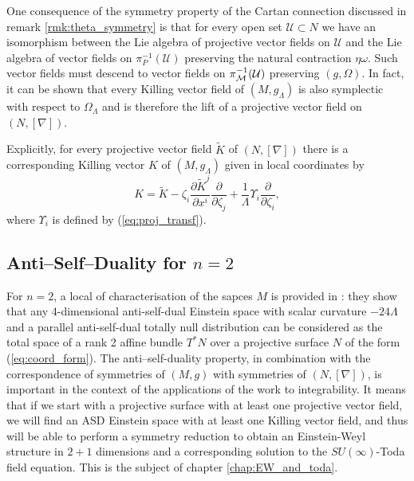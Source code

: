 One consequence of the symmetry property of the Cartan connection discussed in remark \ref{rmk:theta_symmetry} is that for every open set $\mathcal{U}\subset N$ we have an isomorphism between the Lie algebra of projective vector fields on $\mathcal{U}$ and the Lie algebra of vector fields on $\pi_P^{-1}(\mathcal{U})$ preserving the natural contraction $\eta\omega$. Such vector fields must descend to vector fields on $\pi_{\mathcal{M}}^{-1}(\mathcal{U})$ preserving $(g,\Omega)$. In fact, it can be shown that every Killing vector field of $(M,g_\Lambda)$ is also symplectic with respect to $\Omega_\Lambda$ and is therefore the lift of a projective vector field on $(N,[\nabla])$.

Explicitly, for every projective vector field $\tilde{K}$ of $(N,[\nabla])$
there is a corresponding Killing vector $K$ of $(M,g_{\Lambda})$
given in local coordinates by 
\begin{equation}
{K}=\tilde{K}-\zeta_{i}\frac{\partial \tilde{K}^{j}}{\partial x^{i}}\frac{\partial}{\partial \zeta_{j}}+\frac{1}{\Lambda}\Upsilon_{i}\frac{\partial}{\partial \zeta_{i}},\label{eq:kvf_from_pvf}
\end{equation}
where $\Upsilon_{i}$ is defined by (\ref{eq:proj_transf}).

\subsection{Anti--Self--Duality for $n=2$}

For $n=2$, a local of characterisation of the sapces $M$ is provided in
\cite{DM}: they show that any 4-dimensional anti-self-dual
Einstein space with scalar curvature $-24\Lambda$ and a parallel
anti-self-dual totally null distribution can be considered as the
total space of a rank 2 affine bundle $T^{*}N$ over a projective
surface $N$ of the form (\ref{eq:coord_form}). The anti--self-duality property, in combination with the correspondence of symmetries of $(M,g)$ with symmetries of $(N,[\nabla])$, is important in the context of the applications of
the work \cite{DM} to integrability. It means that
if we start with a projective surface with at least one projective
vector field, we will find an ASD Einstein space with at least one
Killing vector field, and thus will be able to perform a symmetry
reduction to obtain an Einstein-Weyl structure in $2+1$ dimensions
and a corresponding solution to the $SU(\infty)$-Toda field equation. This is the subject of chapter \ref{chap:EW_and_toda}.
